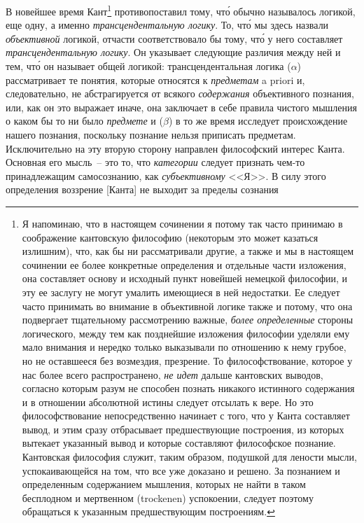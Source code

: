 В новейшее время Кант\footnote{Я напоминаю, что в настоящем сочинении я потому так
  часто принимаю в соображение кантовскую философию (некоторым
  это может казаться излишним), что, как бы ни рассматривали
  другие, а также и мы в настоящем сочинении ее более конкретные
  определения и отдельные части изложения, она составляет
  основу и исходный пункт новейшей немецкой философии,
  и эту ее заслугу не могут умалить имеющиеся в ней недостатки.
  Ее следует часто принимать во внимание в объективной логике
  также и потому, что она подвергает тщательному рассмотрению
  важные, \emph{более определенные} стороны логического, между тем как
  позднейшие изложения философии уделяли ему мало внимания
  и нередко только выказывали по отношению к нему грубое, но
  не оставшееся без возмездия, презрение. То философствование,
  которое у нас более всего распространено, \emph{не идет} дальше кантовских
  выводов, согласно которым разум не способен познать
  никакого истинного содержания и в отношении абсолютной истины
  следует отсылать к вере. Но это философствование непосредственно
  начинает с того, что у Канта составляет вывод, и этим
  сразу отбрасывает предшествующие построения, из которых вытекает
  указанный вывод и которые составляют философское познание.
  Кантовская философия служит, таким образом, подушкой
  для лености мысли, успокаивающейся на том, что все уже доказано
  и решено. За познанием и определенным содержанием мышления,
  которых не найти в таком бесплодном и мертвенном
  (trockenen) успокоении, следует поэтому обращаться к указанным
  предшествующим построениям.} противопоставил тому, чт\'о
обычно называлось логикой, еще одну, а именно \emph{трансцендентальную
логику}. То, чт\'о мы здесь назвали \emph{объективной}
логикой, отчасти соответствовало бы тому, чт\'о
у него составляет \emph{трансцендентальную логику}. Он указывает
следующие различия между ней и тем, чт\'о он
называет общей логикой: трансцендентальная логика ($\alpha$)
рассматривает те понятия, которые относятся к \emph{предметам}
a priori и, следовательно, не абстрагируется от всякого
\emph{содержания} объективного познания, или, как он это
выражает иначе, она заключает в себе правила чистого
мышления о каком бы то ни было \emph{предмете} и ($\beta$) в то
же время исследует происхождение нашего познания,
поскольку познание нельзя приписать предметам. Исключительно
на эту вторую сторону направлен философский
интерес Канта. Основная его мысль~-- это то, что \emph{категории}
следует признать чем-то принадлежащим самосознанию,
как \emph{субъективному} <<Я>>. В силу этого определения
воззрение [Канта] не выходит за пределы сознания
